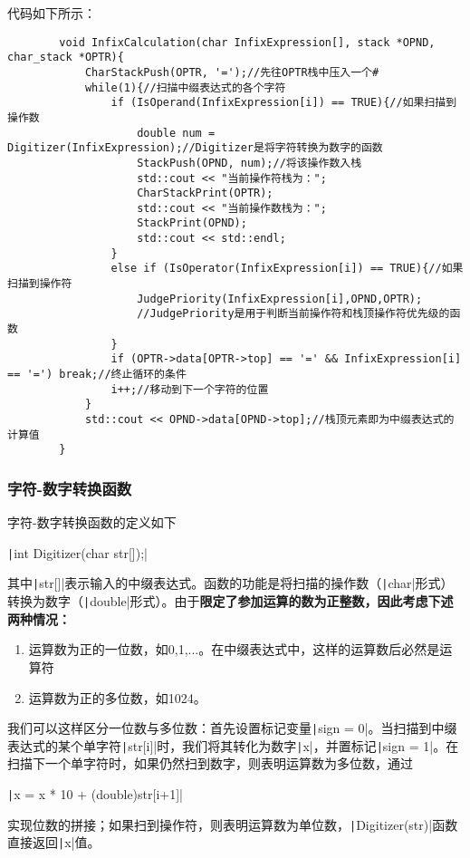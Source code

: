 \documentclass[10pt,a4paper]{article}
\begin{document}
	代码如下所示：
	\begin{verbatim}
		void InfixCalculation(char InfixExpression[], stack *OPND, char_stack *OPTR){
			CharStackPush(OPTR, '=');//先往OPTR栈中压入一个#
			while(1){//扫描中缀表达式的各个字符
				if (IsOperand(InfixExpression[i]) == TRUE){//如果扫描到操作数
					double num = Digitizer(InfixExpression);//Digitizer是将字符转换为数字的函数
					StackPush(OPND, num);//将该操作数入栈
					std::cout << "当前操作符栈为：";
					CharStackPrint(OPTR);
					std::cout << "当前操作数栈为：";
					StackPrint(OPND);
					std::cout << std::endl;
				}
				else if (IsOperator(InfixExpression[i]) == TRUE){//如果扫描到操作符
					JudgePriority(InfixExpression[i],OPND,OPTR);
					//JudgePriority是用于判断当前操作符和栈顶操作符优先级的函数
				}
				if (OPTR->data[OPTR->top] == '=' && InfixExpression[i] == '=') break;//终止循环的条件
				i++;//移动到下一个字符的位置
			}
			std::cout << OPND->data[OPND->top];//栈顶元素即为中缀表达式的计算值
		}
	\end{verbatim}
	\subsubsection{字符-数字转换函数}
	\noindent 字符-数字转换函数的定义如下
	\begin{center}
		\texttt|int Digitizer(char str[]);|
	\end{center}
	其中\texttt|str[]|表示输入的中缀表达式。函数的功能是将扫描的操作数（\texttt|char|形式）转换为数字（\texttt|double|形式）。由于\textbf{限定了参加运算的数为正整数，因此考虑下述两种情况：}
	\begin{enumerate}
		\item 运算数为正的一位数，如0,1,...。在中缀表达式中，这样的运算数后必然是运算符
		\item 运算数为正的多位数，如1024。
	\end{enumerate}
	我们可以这样区分一位数与多位数：首先设置标记变量\texttt|sign = 0|。当扫描到中缀表达式的某个单字符\texttt|str[i]|时，我们将其转化为数字\texttt|x|，并置标记\texttt|sign = 1|。在扫描下一个单字符时，如果仍然扫到数字，则表明运算数为多位数，通过
	\begin{center}
		\texttt|x = x * 10 + (double)str[i+1]|
	\end{center}
	实现位数的拼接；如果扫到操作符，则表明运算数为单位数，\texttt|Digitizer(str)|函数直接返回\texttt|x|值。\\
	
\end{document}
